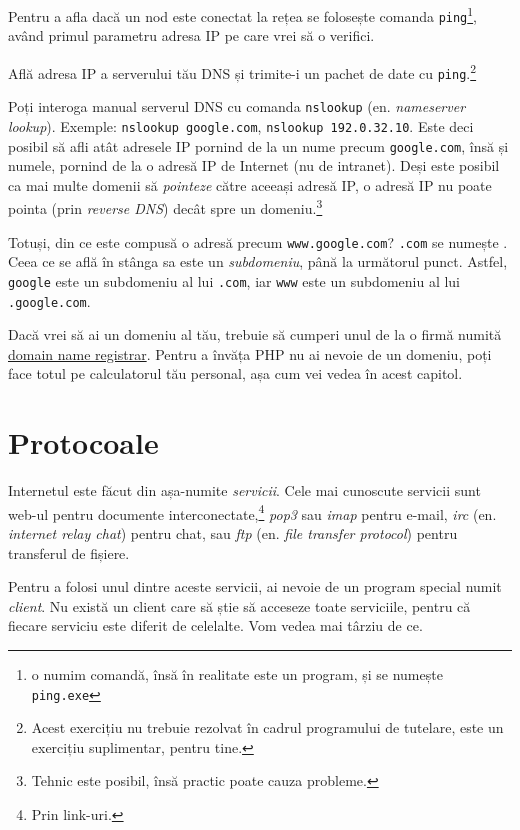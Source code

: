 Pentru a afla dacă un nod este conectat la rețea se folosește comanda
\texttt{ping}\footnote{o numim comandă, însă în realitate este un program,
și se numește \texttt{ping.exe}}, având primul
parametru adresa IP pe care vrei să o verifici.

\begin{Exercise}[title={Ping your DNS server}]
Află adresa IP a serverului tău DNS și trimite-i un pachet de date cu \texttt{ping}.\footnote{Acest exercițiu nu trebuie
rezolvat în cadrul programului de tutelare, este un exercițiu suplimentar,
pentru tine.}
\end{Exercise}

Poți interoga manual serverul DNS cu comanda \texttt{nslookup}
(en. \textsl{nameserver lookup}). Exemple:
\texttt{nslookup google.com}, \texttt{nslookup 192.0.32.10}.
Este deci posibil să afli atât adresele IP pornind de la un nume precum
\texttt{google.com}, însă și numele, pornind de la o adresă IP de Internet
(nu de intranet).
Deși este posibil ca mai multe domenii să \textsl{pointeze} către aceeași
adresă IP, o adresă IP nu poate {\glqq}pointa{\grqq} (prin \textsl{reverse DNS})
decât spre un domeniu.\footnote{Tehnic este posibil, însă practic poate
cauza probleme.}

Totuși, din ce este compusă o adresă precum \texttt{www.google.com}?
\texttt{.com} se numește . Ceea ce se află în stânga
sa este un \textsl{subdomeniu}, până la următorul punct.
Astfel, \texttt{google} este un subdomeniu al lui \texttt{.com},
iar \texttt{www} este un subdomeniu al lui \texttt{.google.com}.

Dacă vrei să ai un domeniu al tău, trebuie să cumperi unul de la
o firmă numită \href{http://en.wikipedia.org/wiki/Domain_name_registrar}{domain name
registrar}. Pentru a învăța PHP nu ai nevoie de un domeniu, poți
face totul pe calculatorul tău personal, așa cum vei vedea în acest capitol.

\section{Protocoale}
Internetul este {\glqq}făcut{\grqq} din așa-numite \textsl{servicii}. Cele mai cunoscute servicii sunt
web-ul pentru documente interconectate,\footnote{Prin link-uri.}
\textsl{pop3} sau \textsl{imap} pentru e-mail,
\textsl{irc} (en. \textsl{internet relay chat}) pentru chat, sau
\textsl{ftp} (en. \textsl{file transfer protocol}) pentru transferul de fișiere.

Pentru a folosi unul dintre aceste servicii, ai nevoie de un program
special numit \textsl{client}. Nu există un client care să {\glqq}știe{\grqq} 
să acceseze toate serviciile, pentru
că fiecare serviciu este diferit de celelalte. Vom vedea mai târziu de ce.

